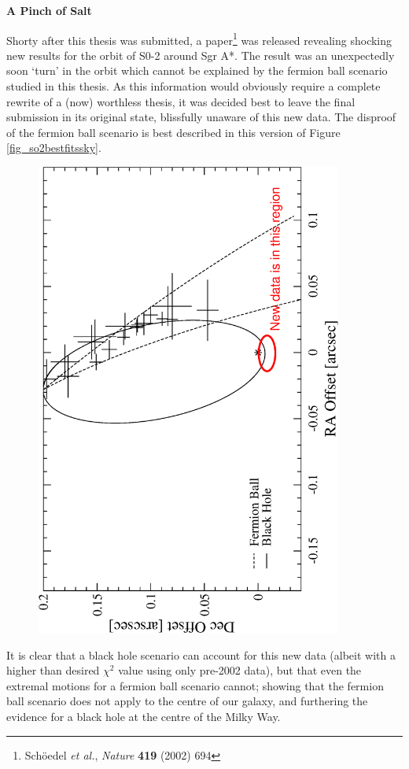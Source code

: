 \thispagestyle{empty}
\begin{center}
 \Large{\bf A Pinch of Salt}
\end{center}
Shorty after this thesis was submitted, a paper\footnote{Sch\"{o}edel {\it et al.}, {\it Nature} {\bf 419} (2002) 694} was released
revealing shocking new results for the orbit of S0-2 around Sgr A*.
The result was an unexpectedly soon `turn' in the orbit which cannot be explained by the fermion ball scenario studied in this thesis.
As this information would
obviously require a complete rewrite of a (now) worthless thesis, it was decided best to leave the final submission in its original state,
blissfully unaware of this new data. The disproof of the fermion ball scenario is best described in this version of
Figure \ref{fig_so2bestfitssky}.
\begin{figure}[!h]
	\begin{center}
	\includegraphics[angle=-90,width=0.9\textwidth]{eps/killer.eps}
	\end{center}
\end{figure}

It is clear that a black hole scenario can account for this new data (albeit with a higher than desired $\chi^2$ value using only
pre-2002 data), but that even the extremal motions for a fermion ball scenario cannot; showing that the fermion ball scenario does
not apply to the centre of our galaxy, and furthering the evidence for a black hole at the centre of the Milky Way.
\clearpage
